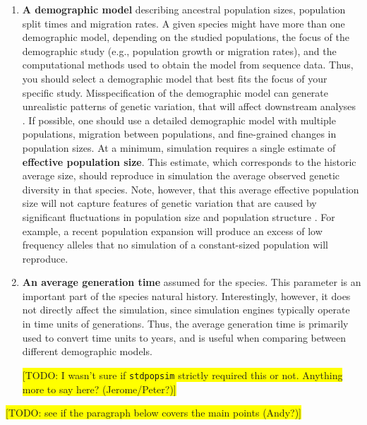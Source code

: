 \documentclass[hidelinks]{article}
\newcommand{\stdpopsim}{\texttt{stdpopsim}\xspace}
\begin{document}
\begin{enumerate}
\item
  \textbf{A demographic model} describing ancestral population sizes, population split times and migration rates. A given species might have more than one demographic model, depending on the studied populations, the focus of the demographic study (e.g., population growth or migration rates), and the computational methods used to obtain the model from sequence data. Thus, you should select a demographic model that best fits the focus of your specific study. Misspecification of the demographic model can generate unrealistic patterns of genetic variation, that will affect downstream analyses \citep[e.g.,][]{Navascues2009}. If possible, one should use a detailed demographic model with multiple populations, migration between populations, and fine-grained changes in population sizes. At a minimum, simulation requires a single estimate of \textbf{effective population size}. This estimate, which corresponds to the historic average size, should reproduce in simulation the average observed genetic diversity in that species. Note, however, that this average effective population size will not capture features of genetic variation that are caused by significant fluctuations in population size and population structure \citep{MacLeod2013}. For example, a recent population expansion will produce
  an excess of low frequency alleles that no simulation of a constant-sized
  population will reproduce.

\item
  \textbf{An average generation time} assumed for the species. 
  This parameter is an important part of the species natural history.
  Interestingly, however, it does not directly affect the simulation, since 
  simulation engines typically operate in time units of generations. Thus, the average generation time is primarily used to convert time units to years, and is useful when comparing between different demographic models.
  
  \colorbox{yellow}{[TODO: I wasn't sure if \stdpopsim strictly required this or not. Anything more to say here? (Jerome/Peter?)]}
  
\end{enumerate}

\colorbox{yellow}{[TODO: see if the paragraph below covers the main points (Andy?)]}
\end{document}
